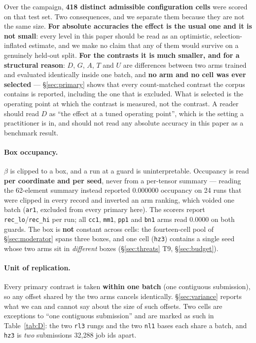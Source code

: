 \documentclass[10pt,letterpaper]{article}
\newcommand{\Dstat}{D}                         %
\newcommand{\Gstat}{G}                         %
\newcommand{\Astat}{A}                         %
\newcommand{\Tstat}{T}                         %
\newcommand{\Ustat}{U}                         %
\newcommand{\arm}[1]{\texttt{#1}}
\begin{document}
Over the campaign, \textbf{418 distinct admissible configuration cells} were scored on that test
set. Two consequences, and we separate them because they are not the same size. \textbf{For
absolute accuracies the effect is the usual one and it is not small}: every level in this paper
should be read as an optimistic, selection-inflated estimate, and we make no claim that any of
them would survive on a genuinely held-out split. \textbf{For the contrasts it is much smaller,
and for a structural reason}: $\Dstat$, $\Gstat$, $\Astat$, $\Tstat$ and $\Ustat$ are differences
between two arms trained and evaluated identically inside one batch, and \textbf{no arm and no
cell was ever selected} --- \S\ref{sec:primary} shows that every count-matched contrast the
corpus contains is reported, including the one that is excluded. What is selected is the
operating point at which the contrast is measured, not the contrast. A reader should read
$\Dstat$ as ``the effect at a tuned operating point'', which is the setting a practitioner is
in, and should not read any absolute accuracy in this paper as a benchmark result.

\paragraph{Box occupancy.}
$\beta$ is clipped to a box, and a run at a guard is uninterpretable. Occupancy is read
\textbf{per coordinate and per seed}, never from a per-tensor summary --- reading the 62-element
summary instead reported 0.000000 occupancy on 24 runs that were clipped in every record and
inverted an arm ranking, which voided one batch (\arm{ar1}, excluded from every primary here).
The scorers report \texttt{rec\_lo}/\texttt{rec\_hi} per run; all \arm{cc1}, \arm{mm1},
\arm{pp1} and \arm{bn1} arms read 0.0000 on both guards. The box is \textbf{not} constant across
cells: the fourteen-cell pool of \S\ref{sec:moderator} spans three boxes, and one cell (\arm{hz3})
contains a single seed whose two arms sit in \emph{different} boxes
(\S\ref{sec:threats} T9, \S\ref{sec:budget}).

\paragraph{Unit of replication.}
Every primary contrast is taken \textbf{within one batch} (one contiguous submission), so any
offset shared by the two arms cancels identically. \S\ref{sec:variance} reports what we can and
cannot say about the size of such offsets. Two cells are exceptions to ``one contiguous
submission'' and are marked as such in Table~\ref{tab:D}: the two \arm{rl3} rungs and the two
\arm{nl1} bases each share a batch, and \arm{hz3} is \emph{two} submissions 32{,}288 job ids
apart.
\end{document}
